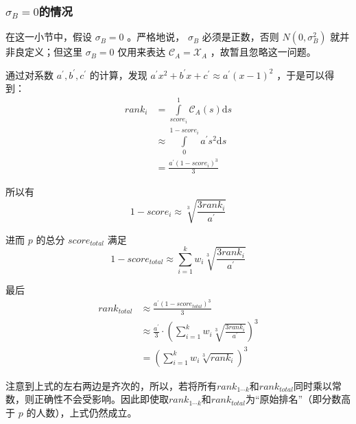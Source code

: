         \subsubsection{$\sigma_B=0$的情况}

            在这一小节中，假设 $\sigma_B=0$ 。严格地说， $\sigma_B$ 必须是正数，否则 $N(0,\sigma_B^2)$ 就并非良定义；但这里 $\sigma_B=0$ 仅用来表达 $\mathcal{C}_A=\mathcal{X}_A$ ，故暂且忽略这一问题。

            通过对系数 $a^\prime,b^\prime,c^\prime$ 的计算，发现 $a^\prime x^2+b^\prime x+c^\prime\approx a^\prime(x-1)^2$ ，于是可以得到：
            \begin{align*}
                \textit{rank}_i
                &=\int\limits_{\textit{score}_i}^1 \mathcal{C}_A(s) \mathrm{d}s \\
                &\approx\int\limits_0^{1-\textit{score}_i} a^\prime s^2 \mathrm{d}s \\
                &=\frac{a^\prime\left(1-\textit{score}_i\right)^3}3
            \end{align*}

            所以有
            $$
            1-\textit{score}_i\approx\sqrt[3]{\frac{3\textit{rank}_i}{a^\prime}}
            $$

            进而 $p$ 的总分 $\textit{score}_{\textit{total}}$ 满足
            $$
            1-\textit{score}_{\textit{total}}\approx\sum\limits_{i=1}^k w_i\sqrt[3]{\frac{3\textit{rank}_i}{a^\prime}}
            $$

            最后
            \begin{align*}
                \textit{rank}_{\textit{total}}
                &\approx\frac{a^\prime(1-\textit{score}_{\textit{total}})^3}3 \\
                &\approx\frac{a^\prime}{3}\cdot\left(\sum\limits_{i=1}^k w_i\sqrt[3]{\frac{3\textit{rank}_i}{a^\prime}}\right)^3 \\
                &=\left(\sum\limits_{i=1}^k w_i\sqrt[3]{\textit{rank}_i}\right)^3
            \end{align*}

            注意到上式的左右两边是齐次的，所以，若将所有$\textit{rank}_{1\cdots k}$和$\textit{rank}_{\textit{total}}$同时乘以常数，则正确性不会受影响。因此即使取$\textit{rank}_{1\cdots k}$和$\textit{rank}_{\textit{total}}$为“原始排名”（即分数高于 $p$ 的人数），上式仍然成立。
            
            \vspace{1.5ex}

